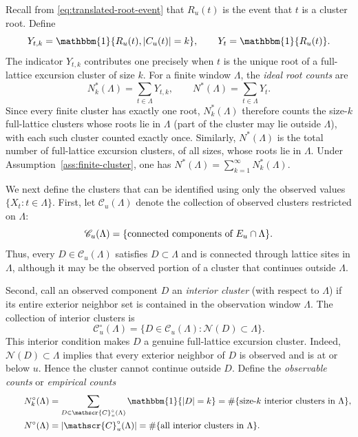 \documentclass[aap,preprint]{imsart}
\theoremstyle{plain}
\theoremstyle{definition}
\begin{document}
	Recall from \eqref{eq:translated-root-event} that
	$R_u(t)$ is the event that $t$ is a cluster root.  Define
	\begin{equation}\label{eq:empirical-root-indicators}
		Y_{t,k}=\mathbbm{1}\{R_u(t),|C_u(t)|=k\},
		\qquad
		Y_t=\mathbbm{1}\{R_u(t)\}.
	\end{equation}
	The indicator $Y_{t,k}$ contributes one
	precisely when $t$ is the unique root of a full-lattice excursion cluster of
	size $k$.  For a finite window $\Lambda$, the \textit{ideal root counts} are
	\begin{equation}\label{eq:ideal-root-counts}
		N_k^*(\Lambda)=\sum_{t\in\Lambda}Y_{t,k},
		\qquad
		N^*(\Lambda)=\sum_{t\in\Lambda}Y_t.
	\end{equation}
	 Since every finite cluster has exactly one root,
	$N_k^*(\Lambda)$ therefore counts the size-$k$ full-lattice clusters whose
	roots lie in $\Lambda$ (part of the cluster may lie outside $\Lambda$), with each such cluster counted exactly once. Similarly, $N^*(\Lambda)$ is the total number of full-lattice excursion clusters, of all sizes, whose roots lie in $\Lambda$. Under Assumption~\ref{ass:finite-cluster}, one has $N^*(\Lambda)=\sum_{k=1}^{\infty}N_k^*(\Lambda)$.
	
	
	We next define the clusters that can be identified using only the observed
	values $\{X_t:t\in\Lambda\}$. First, let $\mathscr{C}_u(\Lambda)$ denote the collection of observed clusters restricted on $\Lambda$:
	\begin{equation}\label{eq:clusters-restriction}
		\mathscr{C}_u(\Lambda)
		=
		\{\text{\rm connected components of } E_u\cap\Lambda\}.
	\end{equation}
	Thus, every $D\in \mathscr{C}_u(\Lambda)$ satisfies
	$D\subset\Lambda$ and is connected through lattice sites in $\Lambda$, although it may be the observed portion of a cluster
	that continues outside $\Lambda$.
	
	Second, call an observed component $D$ an \emph{interior cluster} (with
	respect to $\Lambda$) if its entire exterior neighbor set is contained in the observation window $\Lambda$. The collection of interior clusters is
	\begin{equation}\label{eq:observable-interior-components}
		\mathscr{C}_u^\circ(\Lambda)
		=
		\{D\in \mathscr{C}_u(\Lambda):\mathcal N(D)\subset\Lambda\}.
	\end{equation}
	This interior condition makes $D$ a genuine full-lattice excursion cluster.
	Indeed, $\mathcal N(D)\subset\Lambda$ implies that every
	exterior neighbor of $D$ is observed and is at or below $u$.  Hence the
	cluster cannot continue outside $D$. Define the \textit{observable counts} or \textit{empirical counts}
	\begin{equation}\label{eq:observable-cluster-counts}
	\begin{split}
		N_k^\circ(\Lambda)
		&=\sum_{D\in \mathscr{C}_u^\circ(\Lambda)}
		\mathbbm{1}\{|D|=k\}=\#\{\text{size-$k$ interior clusters in $\Lambda$}\},\\
		\qquad
		N^\circ(\Lambda)&=| \mathscr{C}_u^\circ(\Lambda)|=\#\{\text{all interior clusters in $\Lambda$}\}.
		\end{split}
	\end{equation}
	
\end{document}

